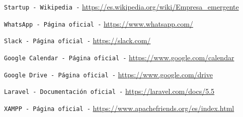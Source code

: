 
 {\tt Startup - Wikipedia -} \url{https://es.wikipedia.org/wiki/Empresa_emergente}

 {\tt WhatsApp - Página oficial -} \url{https://www.whatsapp.com/}

 {\tt Slack - Página oficial -} \url{https://slack.com/}

 {\tt Google Calendar - Página oficial -} \url{https://www.google.com/calendar}

 {\tt Google Drive - Página oficial -} \url{https://www.google.com/drive}

 {\tt Laravel - Documentación oficial -} \url{https://laravel.com/docs/5.5}

 {\tt XAMPP - Página oficial -} \url{https://www.apachefriends.org/es/index.html}





















